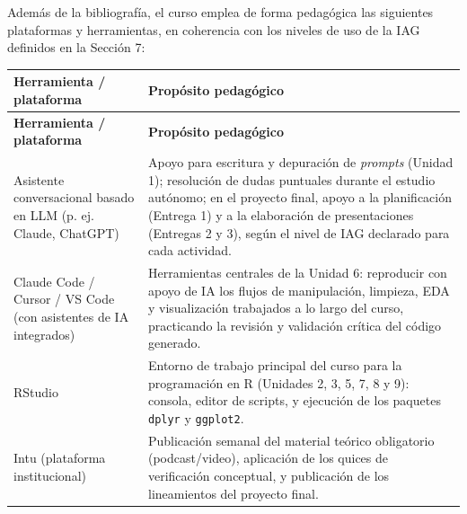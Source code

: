 \documentclass[11pt,a4paper]{article}
\begin{document}
Además de la bibliografía, el curso emplea de forma pedagógica las siguientes plataformas y herramientas, en coherencia con los niveles de uso de la IAG definidos en la Sección 7:

\begin{center}
\small
\setlength{\tabcolsep}{4pt}
\begin{longtable}{|p{4cm}|p{11cm}|}
\hline
\textbf{Herramienta / plataforma} & \textbf{Propósito pedagógico} \\
\hline
\endfirsthead
\hline
\textbf{Herramienta / plataforma} & \textbf{Propósito pedagógico} \\
\hline
\endhead

Asistente conversacional basado en LLM (p. ej. Claude, ChatGPT) &
Apoyo para escritura y depuración de \textit{prompts} (Unidad 1); resolución de dudas puntuales durante el estudio autónomo; en el proyecto final, apoyo a la planificación (Entrega 1) y a la elaboración de presentaciones (Entregas 2 y 3), según el nivel de IAG declarado para cada actividad. \\
\hline

Claude Code / Cursor / VS Code (con asistentes de IA integrados) &
Herramientas centrales de la Unidad 6: reproducir con apoyo de IA los flujos de manipulación, limpieza, EDA y visualización trabajados a lo largo del curso, practicando la revisión y validación crítica del código generado. \\
\hline

RStudio &
Entorno de trabajo principal del curso para la programación en R (Unidades 2, 3, 5, 7, 8 y 9): consola, editor de scripts, y ejecución de los paquetes \texttt{dplyr} y \texttt{ggplot2}. \\
\hline

Intu (plataforma institucional) &
Publicación semanal del material teórico obligatorio (podcast/video), aplicación de los quices de verificación conceptual, y publicación de los lineamientos del proyecto final. \\
\hline

\end{longtable}
\end{center}
\end{document}
